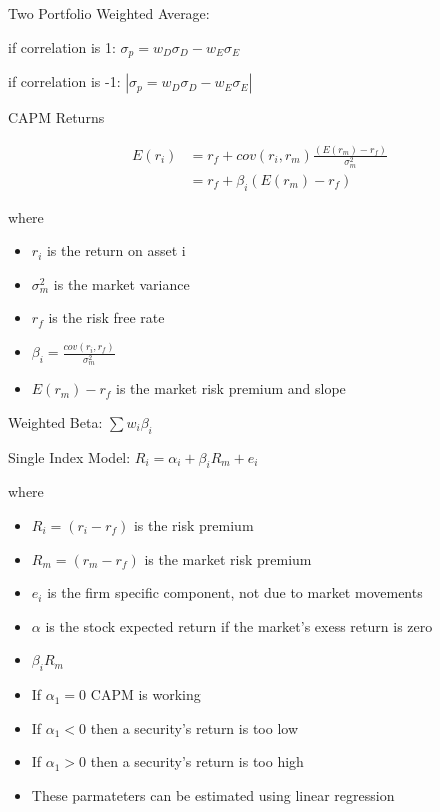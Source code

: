 \documentclass{article}
\begin{document}
Two Portfolio Weighted Average:

if correlation is 1: $ \sigma_p = w_D\sigma_D - w_E\sigma_E $

if correlation is -1: $ | \sigma_p = w_D\sigma_D - w_E\sigma_E | $

CAPM Returns

\begin{align*}
    E(r_i) 
    &= r_f + cov(r_i, r_m)\frac{(E(r_m) - r_f)}{\sigma^2_m} \\
    &= r_f + \beta_i(E(r_m) - r_f)
\end{align*}

where
\begin{itemize}

    \item $r_i$ is the return on asset i

    \item $\sigma^2_m$ is the market variance

    \item $r_f$ is the risk free rate

    \item $ \beta_i = \frac{cov(r_i, r_f)}{\sigma^2_m} $

    \item $ E(r_m) - r_f $ is the market risk premium and slope

\end{itemize}

Weighted Beta: $ \sum w_i\beta_i $

Single Index Model: $ R_i = \alpha_i + \beta_iR_m + e_i $

where
\begin{itemize}

    \item $ R_i = (r_i - r_f) $ is the risk premium

    \item $ R_m = (r_m - r_f) $ is the market risk premium

    \item $ e_i $ is the firm specific component, not due to market movements

    \item $ \alpha $ is the stock expected return if the market's exess return is zero

    \item $ \beta_iR_m $

    \item If $ \alpha_1 = 0 $ CAPM is working

    \item If $ \alpha_1 < 0 $ then a security's return is too low

    \item If $ \alpha_1 > 0 $ then a security's return is too high

    \item These parmateters can be estimated using linear regression

\end{itemize}
\end{document}
